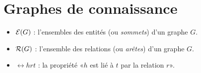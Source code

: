 \section*{Graphes de connaissance}

\begin{itemize}
    \item $\mathcal{E}(G)$ : l'ensembles des entités (ou \textit{sommets}) d'un graphe $G$.
    \item $\mathcal{R}(G)$ : l'ensemble des relations (ou \textit{arêtes}) d'un graphe $G$.
    \item $\rel{h}{r}{t}$ : la propriété «$h$ est lié à $t$ par la relation $r$».
\end{itemize}